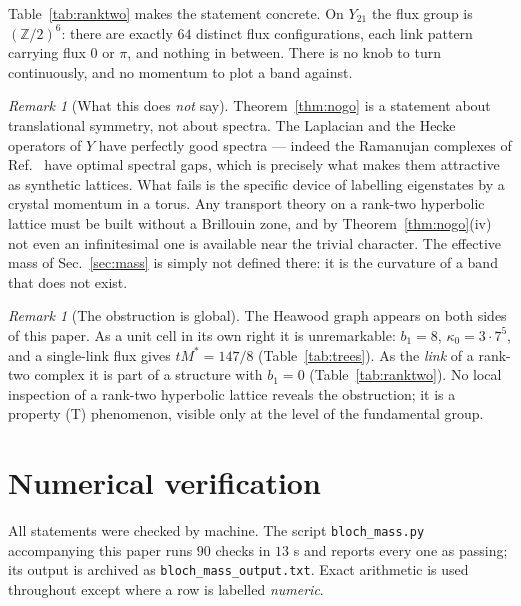 \documentclass[aps,prb,reprint,amsmath,amssymb,floatfix,superscriptaddress]{revtex4-2}
\theoremstyle{plain}
\theoremstyle{definition}
\theoremstyle{remark}
\newtheorem{remark}[theorem]{Remark}
\newcommand{\Z}{\mathbb{Z}}
\begin{document}
Table~\ref{tab:ranktwo} makes the statement concrete. On $Y_{21}$ the flux group is
$(\Z/2)^{6}$: there are exactly $64$ distinct flux configurations, each link pattern
carrying flux $0$ or $\pi$, and nothing in between. There is no knob to turn continuously,
and no momentum to plot a band against.

\begin{remark}[What this does \emph{not} say]\label{rem:notsay}
Theorem~\ref{thm:nogo} is a statement about translational symmetry, not about spectra. The
Laplacian and the Hecke operators of $Y$ have perfectly good spectra --- indeed the
Ramanujan complexes of Ref.~ have optimal spectral gaps, which is precisely
what makes them attractive as synthetic lattices. What fails is the specific device of
labelling eigenstates by a crystal momentum in a torus. Any transport theory on a rank-two
hyperbolic lattice must be built without a Brillouin zone, and by
Theorem~\ref{thm:nogo}(iv) not even an infinitesimal one is available near the trivial
character. The effective mass of Sec.~\ref{sec:mass} is simply not defined there: it is
the curvature of a band that does not exist.
\end{remark}

\begin{remark}[The obstruction is global]\label{rem:global}
The Heawood graph appears on both sides of this paper. As a unit cell in its own right it
is unremarkable: $b_1=8$, $\kappa_0=3\cdot7^{5}$, and a single-link flux gives
$tM^{*}=147/8$ (Table~\ref{tab:trees}). As the \emph{link} of a rank-two complex it is part
of a structure with $b_1=0$ (Table~\ref{tab:ranktwo}). No local inspection of a rank-two
hyperbolic lattice reveals the obstruction; it is a property (T) phenomenon, visible only
at the level of the fundamental group.
\end{remark}

\section{Numerical verification}\label{sec:battery}

All statements were checked by machine. The script \texttt{bloch\_mass.py} accompanying this
paper runs $90$ checks in $13$ s and reports every one as passing; its output is archived as
\texttt{bloch\_mass\_output.txt}. Exact arithmetic is used throughout except where a row is
labelled \emph{numeric}.
\end{document}
